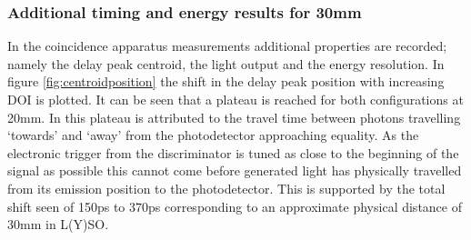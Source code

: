 \subsubsection{Additional timing and energy results for 30mm}
In the coincidence apparatus measurements additional properties are recorded; namely the delay peak centroid, the light output and the energy resolution. In figure \ref{fig:centroidposition} the shift in the delay peak position with increasing DOI is plotted. It can be seen that a plateau is reached for both configurations at 20mm. In \cite{Moses_Derenzo_1999} this plateau is attributed to the travel time between photons travelling `towards' and `away' from the photodetector approaching equality. As the electronic trigger from the discriminator is tuned as close to the beginning of the signal as possible this cannot come before generated light has physically travelled from its emission position to the photodetector. This is supported by the total shift seen of 150ps to 370ps corresponding to an approximate physical distance of 30mm in L(Y)SO.
